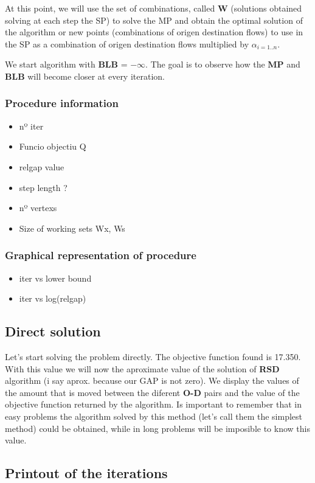 \documentclass[]{article}
\providecommand{\tightlist}{%
  \setlength{\itemsep}{0pt}\setlength{\parskip}{0pt}}
\begin{document}
At this point, we will use the set of combinations, called \textbf{W}
(solutions obtained solving at each step the SP) to solve the MP and
obtain the optimal solution of the algorithm or new points (combinations
of origen destination flows) to use in the SP as a combination of origen
destination flows multiplied by \(\alpha_{i = 1..n}\).

We start algorithm with \textbf{BLB} = \(-\infty\). The goal is to
observe how the \textbf{MP} and \textbf{BLB} will become closer at every
iteration.

\subsubsection{Procedure information}\label{procedure-information}

\begin{itemize}
\tightlist
\item
  nº iter
\item
  Funcio objectiu Q
\item
  relgap value
\item
  step length ?
\item
  nº vertexs
\item
  Size of working sets Wx, Ws
\end{itemize}

\subsubsection{Graphical representation of
procedure}\label{graphical-representation-of-procedure}

\begin{itemize}
\tightlist
\item
  iter vs lower bound
\item
  iter vs log(relgap)
\end{itemize}

\subsection{Direct solution}\label{direct-solution}

Let's start solving the problem directly. The objective function found
is 17.350. With this value we will now the aproximate value of the
solution of \textbf{RSD} algorithm (i say aprox. because our GAP is not
zero). We display the values of the amount that is moved between the
diferent \textbf{O-D} pairs and the value of the objective function
returned by the algorithm. Is important to remember that in easy
problems the algorithm solved by this method (let's call them the
simplest method) could be obtained, while in long problems will be
imposible to know this value.

\subsection{Printout of the
iterations}\label{printout-of-the-iterations}
\end{document}
